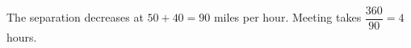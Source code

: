 The separation decreases at $50+40=90$ miles per hour. Meeting takes $\dfrac{360}{90}=\boxed 4$ hours.

